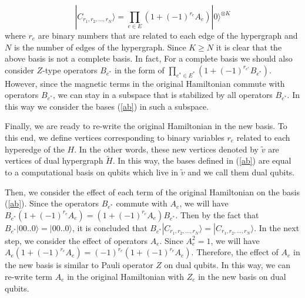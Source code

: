 \documentclass[preprintnumbers, showpacs, floatfix,twocolumn,
preprintnumbers, superscriptaddress]{revtex4}
\def\ra{\rangle}
\begin{document}
\begin{equation}\label{ab}
|C_{r_{1}, r_{2}, ..., r_{N}}\ra=\prod_{e \in E}(1+(-1)^{r_{e}}A_e )|0\ra ^{\otimes K}
\end{equation}
where $r_e$ are binary numbers that are related to each edge of the hypergraph and $N$ is the number of edges of the hypergraph. Since $K\geq N$ it is clear that the above basis is not a complete basis. In fact, For a complete basis we should also consider $Z$-type operators $B_{e^{*}}$ in the form of $\prod_{e^{*} \in E^{*}}(1+(-1)^{r_{e^{*}}}B_{e^{*}} )$. However, since the magnetic terms in the original Hamiltonian commute with operators $B_{e^{*}}$, we can stay in a subspace that is stabilized by all operators $B_{e^{*}}$. In this way we consider the bases (\ref{ab}) in such a subspace.

Finally, we are ready to re-write the original Hamiltonian in the new basis. To this end, we define vertices corresponding to binary variables $r_e$ related to each hyperedge of the $H$. In the other words, these new vertices denoted by $\tilde{v}$ are vertices of dual hypergraph $\tilde{H}$. In this way, the bases defined in (\ref{ab}) are equal to a computational basis on qubits which live in $\tilde{v}$ and we call them dual qubits.

 Then, we consider the effect of each term of the original Hamiltonian on the basis (\ref{ab}). Since the operators $B_{e^{*}}$ commute with $A_e$, we will have $B_{e^{*}}(1+(-1)^{r_e}A_e)=(1+(-1)^{r_e}A_e)B_{e^{*}}$. Then by the fact that $B_{e^{*}}|00..0\ra=|00..0\ra$, it is concluded that $B_{e^{*}}|C_{r_{1}, r_{2}, ..., r_{N}}\ra=|C_{r_{1}, r_{2}, ..., r_{N}}\ra$. In the next step, we consider the effect of operators $A_{e}$. Since $A_{e}^{2}=1$, we will have $A_{e}(1+(-1)^{r_e}A_{e})=(-1)^{r_e}(1+(-1)^{r_e}A_e)$. Therefore, the effect of $A_e$ in the new basis is similar to Pauli operator $Z$ on dual qubits. In this way, we can re-write term $A_e$ in the original Hamiltonian with $Z_e$ in the new basis on dual qubits.
\end{document}
